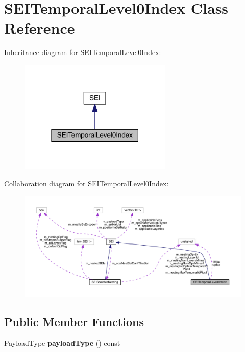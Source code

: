 \hypertarget{class_s_e_i_temporal_level0_index}{}\section{S\+E\+I\+Temporal\+Level0\+Index Class Reference}
\label{class_s_e_i_temporal_level0_index}


Inheritance diagram for S\+E\+I\+Temporal\+Level0\+Index\+:
\nopagebreak
\begin{figure}[H]
\begin{center}
\leavevmode
\includegraphics[width=207pt]{d1/d05/class_s_e_i_temporal_level0_index__inherit__graph}
\end{center}
\end{figure}


Collaboration diagram for S\+E\+I\+Temporal\+Level0\+Index\+:
\nopagebreak
\begin{figure}[H]
\begin{center}
\leavevmode
\includegraphics[width=350pt]{d9/d2c/class_s_e_i_temporal_level0_index__coll__graph}
\end{center}
\end{figure}
\subsection*{Public Member Functions}
\begin{DoxyCompactItemize}
\item 
\mbox{\label{class_s_e_i_temporal_level0_index_a9064fa81ee35b43337aa2047bd80df29}} 
Payload\+Type {\bfseries payload\+Type} () const
\end{DoxyCompactItemize}
